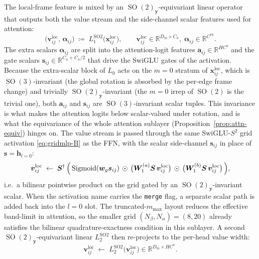 \documentclass[11pt,a4paper]{article}
\DeclareMathOperator{\SO}{SO}
\DeclareMathOperator{\Sigmoid}{Sigmoid}
\newcommand{\R}{\mathbb{R}}
\newcommand{\Sph}{S^2}
\newcommand{\by}{\bm{y}}
\newcommand{\bh}{\bm{h}}
\newcommand{\balpha}{\bm{\alpha}}
\newcommand{\mmax}{m_{\max}}
\theoremstyle{plain}
\theoremstyle{definition}
\theoremstyle{remark}
\begin{document}
The local-frame feature is mixed by an $\SO(2)_{\by}$-equivariant linear
operator that outputs both the value stream and the side-channel scalar
features used for attention:
\begin{equation}\label{eq:so2-1}
    \bigl(\bm{v}^{\mathrm{loc}}_{ij},\,\balpha_{ij}\bigr)\;\coloneqq\;L^{\mathrm{SO2}}_1\bigl(\bm{x}_{ij}^{\mathrm{loc}}\bigr),\qquad
    \bm{v}^{\mathrm{loc}}_{ij}\in\R^{D_m\times C_h},\;\balpha_{ij}\in\R^{C^{\mathrm{ex}}}.
\end{equation}
The extra scalars $\balpha_{ij}$ are split into the attention-logit features $\bm{a}_{ij}\in\R^{H C^{\mathrm{a}}}$ and the gate scalars $\bm{s}_{ij}\in\R^{C_h+C_h/2}$ that drive the SwiGLU gates of the activation.
Because the extra-scalar block of $L_0$ acts on the $m=0$ stratum of $\bm{x}^{\mathrm{loc}}_{ij}$, which is $\SO(3)$-invariant (the global rotation is absorbed by the per-edge frame change) and trivially $\SO(2)_{\by}$-invariant (the $m=0$ irrep of $\SO(2)$ is the trivial one), both $\bm{a}_{ij}$ and $\bm{s}_{ij}$ are $\SO(3)$-invariant scalar tuples.
This invariance is what makes the attention logits below scalar-valued under rotation, and is what the equivariance of the whole attention sublayer (Proposition~\ref{prop:attn-equiv}) hinges on.
The value stream is passed through the same SwiGLU-$\Sph$ grid activation \eqref{eq:gridmlp-B} as the FFN, with the scalar side-channel $\bm{s}_{ij}$ in place of $\bm{s}=\bh_{l=0}$:
\begin{equation}\label{eq:attn-act}
    \bm{v}^{\mathrm{loc}}_{ij}\;\leftarrow\;\bm{S}^{\dagger}\,\Bigl(\,\Sigmoid(\bm{w}_g\bm{s}_{ij})\,\odot\,\bigl(\bm{W}_1^{(a)}\bm{S}\,\bm{v}^{\mathrm{loc}}_{ij}\bigr)\,\odot\,\bigl(\bm{W}_1^{(b)}\bm{S}\,\bm{v}^{\mathrm{loc}}_{ij}\bigr)\,\Bigr),
\end{equation}
i.e.\ a bilinear pointwise product on the grid gated by an $\SO(2)_{\by}$-invariant scalar.
When the activation name carries the \texttt{merge} flag, a separate scalar path is added back into the $l=0$ slot.
The truncated-$\mmax$ layout reduces the effective band-limit in attention, so the smaller grid $(N_\beta,N_\alpha)=(8,20)$ already satisfies the bilinear quadrature-exactness condition in this sublayer.
A second $\SO(2)_{\by}$-equivariant linear $L^{\mathrm{SO2}}_2$ then re-projects to the per-head value width:
\begin{equation}\label{eq:so2-2}
    \bm{v}^{\mathrm{loc}}_{ij}\;\leftarrow\;L^{\mathrm{SO2}}_2\bigl(\bm{v}^{\mathrm{loc}}_{ij}\bigr)\in\R^{D_m\times H C^{\mathrm{v}}}.
\end{equation}
\end{document}
